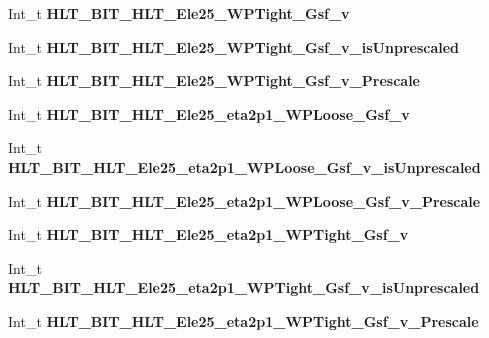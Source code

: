 \begin{DoxyCompactItemize}
Int\+\_\+t {\bfseries H\+L\+T\+\_\+\+B\+I\+T\+\_\+\+H\+L\+T\+\_\+\+Ele25\+\_\+\+W\+P\+Tight\+\_\+\+Gsf\+\_\+v}
\item 
\hypertarget{classMiniTree_ab75b318a5a0e7ea756666e25b136e156}{}\label{classMiniTree_ab75b318a5a0e7ea756666e25b136e156} 
Int\+\_\+t {\bfseries H\+L\+T\+\_\+\+B\+I\+T\+\_\+\+H\+L\+T\+\_\+\+Ele25\+\_\+\+W\+P\+Tight\+\_\+\+Gsf\+\_\+v\+\_\+is\+Unprescaled}
\item 
\hypertarget{classMiniTree_a4581612ebf31799c0622a56c1c1c6139}{}\label{classMiniTree_a4581612ebf31799c0622a56c1c1c6139} 
Int\+\_\+t {\bfseries H\+L\+T\+\_\+\+B\+I\+T\+\_\+\+H\+L\+T\+\_\+\+Ele25\+\_\+\+W\+P\+Tight\+\_\+\+Gsf\+\_\+v\+\_\+\+Prescale}
\item 
\hypertarget{classMiniTree_a822e0e88a9c613f8ea735e4ae34a6c51}{}\label{classMiniTree_a822e0e88a9c613f8ea735e4ae34a6c51} 
Int\+\_\+t {\bfseries H\+L\+T\+\_\+\+B\+I\+T\+\_\+\+H\+L\+T\+\_\+\+Ele25\+\_\+eta2p1\+\_\+\+W\+P\+Loose\+\_\+\+Gsf\+\_\+v}
\item 
\hypertarget{classMiniTree_aae4306507e2e177b43fdae1365d5e751}{}\label{classMiniTree_aae4306507e2e177b43fdae1365d5e751} 
Int\+\_\+t {\bfseries H\+L\+T\+\_\+\+B\+I\+T\+\_\+\+H\+L\+T\+\_\+\+Ele25\+\_\+eta2p1\+\_\+\+W\+P\+Loose\+\_\+\+Gsf\+\_\+v\+\_\+is\+Unprescaled}
\item 
\hypertarget{classMiniTree_a32cb1a47099ed70535987e2486339b5a}{}\label{classMiniTree_a32cb1a47099ed70535987e2486339b5a} 
Int\+\_\+t {\bfseries H\+L\+T\+\_\+\+B\+I\+T\+\_\+\+H\+L\+T\+\_\+\+Ele25\+\_\+eta2p1\+\_\+\+W\+P\+Loose\+\_\+\+Gsf\+\_\+v\+\_\+\+Prescale}
\item 
\hypertarget{classMiniTree_a91158fc3a1c32b59fef3013de9104999}{}\label{classMiniTree_a91158fc3a1c32b59fef3013de9104999} 
Int\+\_\+t {\bfseries H\+L\+T\+\_\+\+B\+I\+T\+\_\+\+H\+L\+T\+\_\+\+Ele25\+\_\+eta2p1\+\_\+\+W\+P\+Tight\+\_\+\+Gsf\+\_\+v}
\item 
\hypertarget{classMiniTree_a6ac9b3947e2af5338caf453a1237c625}{}\label{classMiniTree_a6ac9b3947e2af5338caf453a1237c625} 
Int\+\_\+t {\bfseries H\+L\+T\+\_\+\+B\+I\+T\+\_\+\+H\+L\+T\+\_\+\+Ele25\+\_\+eta2p1\+\_\+\+W\+P\+Tight\+\_\+\+Gsf\+\_\+v\+\_\+is\+Unprescaled}
\item 
\hypertarget{classMiniTree_aa5ab1f66add9e7eddf8ad497987f4c95}{}\label{classMiniTree_aa5ab1f66add9e7eddf8ad497987f4c95} 
Int\+\_\+t {\bfseries H\+L\+T\+\_\+\+B\+I\+T\+\_\+\+H\+L\+T\+\_\+\+Ele25\+\_\+eta2p1\+\_\+\+W\+P\+Tight\+\_\+\+Gsf\+\_\+v\+\_\+\+Prescale}
\item 
\hypertarget{classMiniTree_a4b66894d8d35335dc55d125eceb045d7}{}\label{classMiniTree_a4b66894d8d35335dc55d125eceb045d7} 

\end{DoxyCompactItemize}
